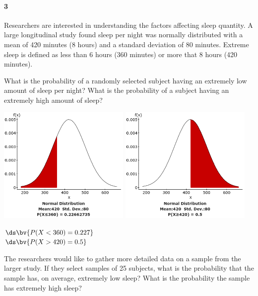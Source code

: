 \documentclass{article}
\begin{document}
\begin{flushleft}
\paragraph{3} Researchers are interested in understanding the factors affecting sleep quantity. A large longitudinal study found sleep per night was normally distributed with a mean of 420 minutes (8 hours) and a standard deviation of 80 minutes. Extreme sleep is defined as less than 6 hours (360 minutes) or more that 8 hours (420 minutes).
\begin{enumalpha}
\item What is the probability of a randomly selected subject having an extremely low amount of sleep per night? What is the probability of a subject having an extremely high amount of sleep?\\
\medskip
{\centering
\includegraphics[width=2.5in]{images/grp06_Q3_a_1} \qquad
\includegraphics[width=2.5in]{images/grp06_Q3_a_2}
\par}
$\ds\bv{P(X < 360) = 0.227}$\\
\medskip
$\ds\bv{P(X > 420) = 0.5}$
\vspace{.4in}
\item The researchers would like to gather more detailed data on a sample from the larger study. If they select samples of 25 subjects, what is the probability that the sample has, on average, extremely low sleep? What is the probability the sample has extremely high sleep?\\

\end{enumalpha}
\end{flushleft}
\end{document}
